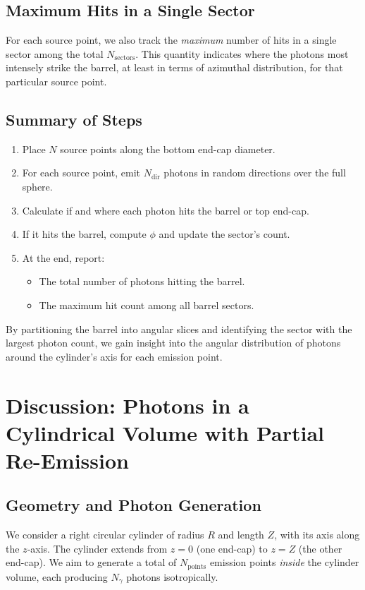 \documentclass[11pt]{article}
\begin{document}
\subsection{Maximum Hits in a Single Sector}
For each source point, we also track the \emph{maximum} number of hits in a single sector among the total \(N_{\mathrm{sectors}}\). This quantity indicates where the photons most intensely strike the barrel, at least in terms of azimuthal distribution, for that particular source point.

\subsection{Summary of Steps}
\begin{enumerate}
  \item Place \(N\) source points along the bottom end-cap diameter.
  \item For each source point, emit \(N_{\mathrm{dir}}\) photons in random directions over the full sphere.
  \item Calculate if and where each photon hits the barrel or top end-cap.
  \item If it hits the barrel, compute \(\phi\) and update the sector's count.
  \item At the end, report:
  \begin{itemize}
    \item The total number of photons hitting the barrel.
    \item The maximum hit count among all barrel sectors.
  \end{itemize}
\end{enumerate}

By partitioning the barrel into angular slices and identifying the sector with the largest photon count, we gain insight into the angular distribution of photons around the cylinder's axis for each emission point.

\section{Discussion: Photons in a Cylindrical Volume with Partial Re-Emission}

\subsection{Geometry and Photon Generation}
We consider a right circular cylinder of radius $R$ and length $Z$, with its axis along the $z$-axis. The cylinder extends from $z = 0$ (one end-cap) to $z = Z$ (the other end-cap). We aim to generate a total of $N_{\mathrm{points}}$ emission points \emph{inside} the cylinder volume, each producing $N_{\gamma}$ photons isotropically.
\end{document}
